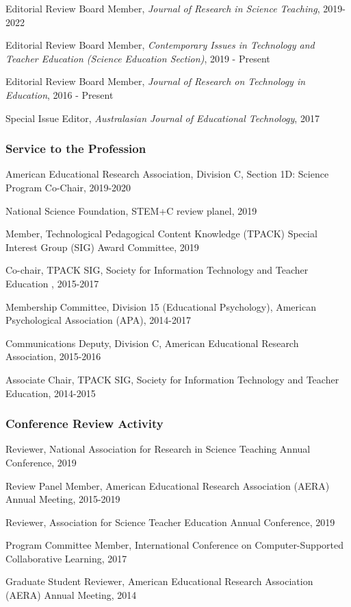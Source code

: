 \documentclass[14,]{article}
\begin{document}
Editorial Review Board Member, \emph{Journal of Research in Science
Teaching}, 2019-2022

Editorial Review Board Member, \emph{Contemporary Issues in Technology
and Teacher Education (Science Education Section)}, 2019 - Present

Editorial Review Board Member, \emph{Journal of Research on Technology
in Education}, 2016 - Present

Special Issue Editor, \emph{Australasian Journal of Educational
Technology}, 2017

\subsubsection{Service to the
Profession}\label{service-to-the-profession}

American Educational Research Association, Division C, Section 1D:
Science Program Co-Chair, 2019-2020

National Science Foundation, STEM+C review planel, 2019

Member, Technological Pedagogical Content Knowledge (TPACK) Special
Interest Group (SIG) Award Committee, 2019

Co-chair, TPACK SIG, Society for Information Technology and Teacher
Education , 2015-2017

Membership Committee, Division 15 (Educational Psychology), American
Psychological Association (APA), 2014-2017

Communications Deputy, Division C, American Educational Research
Association, 2015-2016

Associate Chair, TPACK SIG, Society for Information Technology and
Teacher Education, 2014-2015

\subsubsection{Conference Review
Activity}\label{conference-review-activity}

Reviewer, National Association for Research in Science Teaching Annual
Conference, 2019

Review Panel Member, American Educational Research Association (AERA)
Annual Meeting, 2015-2019

Reviewer, Association for Science Teacher Education Annual Conference,
2019

Program Committee Member, International Conference on Computer-Supported
Collaborative Learning, 2017

Graduate Student Reviewer, American Educational Research Association
(AERA) Annual Meeting, 2014
\end{document}
